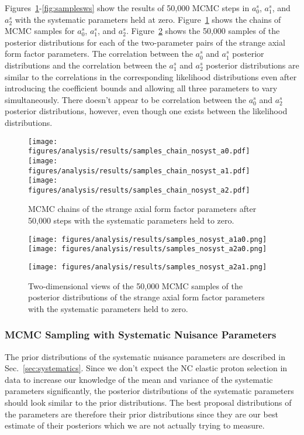     Figures~\ref{fig:chainns}-\ref{fig:samplesws} show the results of 50,000 MCMC steps
    in $a_0^s$, $a_1^s$, and $a_2^s$ with the systematic parameters held at
    zero. Figure~\ref{fig:chainns} shows the chains of MCMC samples for
    $a_0^s$, $a_1^s$, and $a_2^s$. Figure~\ref{fig:samplesns} shows the 50,000
    samples of the posterior distributions for each of the two-parameter pairs
    of the strange axial form factor parameters. The correlation between the
    $a_0^s$ and $a_1^s$ posterior distributions and the correlation between the
    $a_1^s$ and $a_2^s$ posterior distributions are similar to the correlations
    in the corresponding likelihood distributions even after introducing the
    coefficient bounds and allowing all three parameters to vary
    simultaneously. There doesn't appear to be correlation between the $a_0^s$
    and $a_2^s$ posterior distributions, however, even though one exists
    between the likelihood distributions.
    \begin{figure}[h]
      \centering
      \texttt{[image: figures/analysis/results/samples\_chain\_nosyst\_a0.pdf]} \\
      \texttt{[image: figures/analysis/results/samples\_chain\_nosyst\_a1.pdf]} \\
      \texttt{[image: figures/analysis/results/samples\_chain\_nosyst\_a2.pdf]}
      \caption{MCMC chains of the strange axial form factor parameters after
      50,000 steps with the systematic parameters held to zero.}
      \label{fig:chainns}
    \end{figure}
    \begin{figure}[h]
      \texttt{[image: figures/analysis/results/samples\_nosyst\_a1a0.png]}
      \hspace{2pt}
      \texttt{[image: figures/analysis/results/samples\_nosyst\_a2a0.png]}
      \begin{flushright}
      \texttt{[image: figures/analysis/results/samples\_nosyst\_a2a1.png]}
      \end{flushright} 
      \caption{Two-dimensional views of the 50,000 MCMC samples of the
      posterior distributions of the strange axial form factor parameters with
      the systematic parameters held to zero.}
      \label{fig:samplesns}
    \end{figure}
  

  \subsubsection{MCMC Sampling with Systematic Nuisance Parameters}
    The prior distributions of the systematic nuisance parameters are described
    in Sec.~\ref{sec:systematics}. Since we don't expect the NC elastic proton
    selection in data to increase our knowledge of the mean and variance of the
    systematic parameters significantly, the posterior distributions of the
    systematic parameters should look similar to the prior distributions. The
    best proposal distributions of the parameters are therefore their prior
    distributions since they are our best estimate of their posteriors which we
    are not actually trying to measure.

